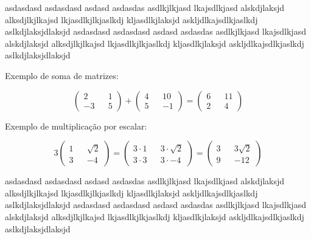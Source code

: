 \documentclass[main_estudante.tex]{subfiles}
\begin{document}
\begin{adjustwidth}{0pt}{0pt}
	asdasdasd asdasdasd asdasd asdasdas asdlkjlkjasd lkajsdlkjasd alskdjlaksjd alksdjlkjlkajsd lkjasdlkjlkjaslkdj kljasdlkjlaksjd askljdlkajsdlkjaslkdj aslkdjlaksjdlaksjd	asdasdasd asdasdasd asdasd asdasdas asdlkjlkjasd lkajsdlkjasd alskdjlaksjd alksdjlkjlkajsd lkjasdlkjlkjaslkdj kljasdlkjlaksjd askljdlkajsdlkjaslkdj aslkdjlaksjdlaksjd 
	
\begin{shaded*}
  \begin{adjustwidth}{-20pt}{-20pt}
  \noindent  Exemplo de soma de matrizes:


  $$\begin{pmatrix} 2 && 1 \\ -3 && 5 \end{pmatrix} + \begin{pmatrix} 4 && 10 \\ 5 && -1 \end{pmatrix} = \begin{pmatrix} 6 && 11 \\ 2 && 4  \end{pmatrix}$$
  
  \end{adjustwidth}
\end{shaded*}

\noindent\begin{shaded*}
 \noindent  Exemplo de multiplicação por escalar:
 
 $$3 \begin{pmatrix} 1 && \sqrt{2} \\ 3 && -4 \end{pmatrix} = \begin{pmatrix} 3 \cdot 1 && 3 \cdot \sqrt{2} \\ 3 \cdot 3 && 3 \cdot -4 \end{pmatrix} = \begin{pmatrix} 3 && 3 \sqrt{2} \\ 9 && -12 \end{pmatrix}$$
\end{shaded*}

	asdasdasd asdasdasd asdasd asdasdas asdlkjlkjasd lkajsdlkjasd alskdjlaksjd alksdjlkjlkajsd lkjasdlkjlkjaslkdj kljasdlkjlaksjd askljdlkajsdlkjaslkdj aslkdjlaksjdlaksjd	asdasdasd asdasdasd asdasd asdasdas asdlkjlkjasd lkajsdlkjasd alskdjlaksjd alksdjlkjlkajsd lkjasdlkjlkjaslkdj kljasdlkjlaksjd askljdlkajsdlkjaslkdj aslkdjlaksjdlaksjd


\end{adjustwidth}
\end{document}
